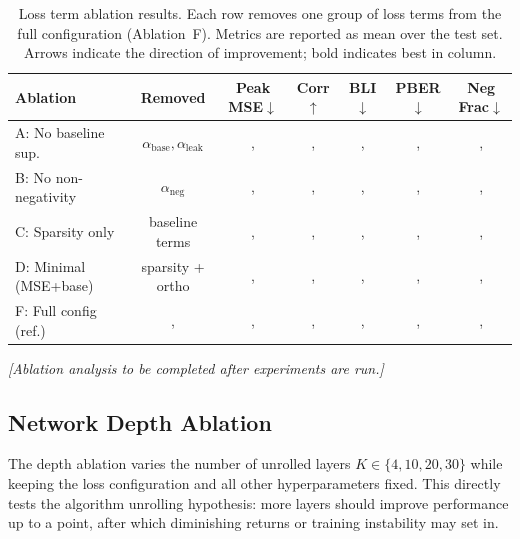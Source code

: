 \begin{table}[t]
    \centering
    \caption{Loss term ablation results. Each row removes one group of loss terms from the full configuration (Ablation~F). Metrics are reported as mean over the test set. Arrows indicate the direction of improvement; bold indicates best in column.}
    \label{tab:ablation_loss}
    \small
    \begin{tabular}{@{}lcccccc@{}}
        \toprule
        \textbf{Ablation} & \textbf{Removed} & \textbf{Peak MSE}$\downarrow$ & \textbf{Corr}$\uparrow$ & \textbf{BLI}$\downarrow$ & \textbf{PBER}$\downarrow$ & \textbf{Neg Frac}$\downarrow$ \\
        \midrule
        A: No baseline sup. & $\alpha_{\text{base}}, \alpha_{\text{leak}}$ & ,  & ,  & ,  & ,  & ,  \\
        B: No non-negativity & $\alpha_{\text{neg}}$ & ,  & ,  & ,  & ,  & ,  \\
        C: Sparsity only & baseline terms & ,  & ,  & ,  & ,  & ,  \\
        D: Minimal (MSE+base) & sparsity + ortho & ,  & ,  & ,  & ,  & ,  \\
        F: Full config (ref.) & ,  & ,  & ,  & ,  & ,  & ,  \\
        \bottomrule
    \end{tabular}
\end{table}


\textit{[Ablation analysis to be completed after experiments are run.]}


\subsection{Network Depth Ablation}
\label{sec:results_depth_ablation}

The depth ablation varies the number of unrolled layers $K \in \{4, 10, 20, 30\}$ while keeping the loss configuration and all other hyperparameters fixed. This directly tests the algorithm unrolling hypothesis: more layers should improve performance up to a point, after which diminishing returns or training instability may set in.


